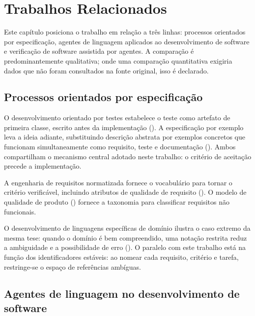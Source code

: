 
\chapter{Trabalhos Relacionados}
\label{cap:relacionados}

Este capítulo posiciona o trabalho em relação a três linhas: processos
orientados por especificação, agentes de linguagem aplicados ao desenvolvimento
de software e verificação de software assistida por agentes. A comparação é
predominantemente qualitativa; onde uma comparação quantitativa exigiria dados
que não foram consultados na fonte original, isso é declarado.

\section{Processos orientados por especificação}
\label{sec:rel-sdd}

O desenvolvimento orientado por testes estabelece o teste como artefato de
primeira classe, escrito antes da implementação (). A
especificação por exemplo leva a ideia adiante, substituindo descrição abstrata
por exemplos concretos que funcionam simultaneamente como requisito, teste e
documentação (). Ambos compartilham o mecanismo central
adotado neste trabalho: o critério de aceitação precede a implementação.

A engenharia de requisitos normatizada fornece o vocabulário para tornar o
critério verificável, incluindo atributos de qualidade de requisito
(). O modelo de qualidade de produto
() fornece a taxonomia para classificar requisitos não
funcionais.

O desenvolvimento de linguagens específicas de domínio ilustra o caso extremo da
mesma tese: quando o domínio é bem compreendido, uma notação restrita reduz a
ambiguidade e a possibilidade de erro (). O paralelo com
este trabalho está na função dos identificadores estáveis: ao nomear cada
requisito, critério e tarefa, restringe-se o espaço de referências ambíguas.

\section{Agentes de linguagem no desenvolvimento de software}
\label{sec:rel-agentes}


